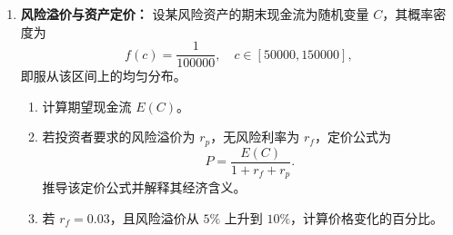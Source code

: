 \documentclass{article}
\begin{document}
\begin{enumerate}
\item \textbf{风险溢价与资产定价：}
设某风险资产的期末现金流为随机变量 $C$，其概率密度为
\[
f(c) = \frac{1}{100000}, \quad c \in [50000, 150000],
\]
即服从该区间上的均匀分布。
\begin{enumerate}
\item 计算期望现金流 $E(C)$。
\item 若投资者要求的风险溢价为 $r_p$，无风险利率为 $r_f$，定价公式为
\[
P = \frac{E(C)}{1 + r_f + r_p}.
\]
推导该定价公式并解释其经济含义。
\item 若 $r_f = 0.03$，且风险溢价从 $5\%$ 上升到 $10\%$，计算价格变化的百分比。
\end{enumerate}

\end{enumerate}
\end{document}
